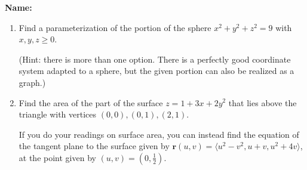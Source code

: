 \documentclass[12pt]{article}
\renewcommand{\r}{\mathbf{r}}
\begin{document}
{\bf \Large Name:}
\thispagestyle{fancy}

\bigskip

\begin{enumerate}

 \item Find a parameterization of the portion of the sphere $x^2+y^2+z^2=9$ with $x,y,z\geq 0$.

(Hint: there is more than one option. There is a perfectly good coordinate system adapted to a sphere, but the given portion can also be realized as a graph.)

\vspace{2.5in}

 \item Find the area of the part of the surface $z=1+3x+2y^2$ that lies above the triangle with vertices $(0,0), (0,1), (2,1)$.

\medskip

 If you do your readings on surface area, you can instead find the equation of the tangent plane to the surface given by $\r(u,v) = \langle u^2-v^2, u+v, u^2+4v\rangle$, at the point given by $(u,v)=(0,\frac{1}{2})$.
\end{enumerate}
\end{document}
